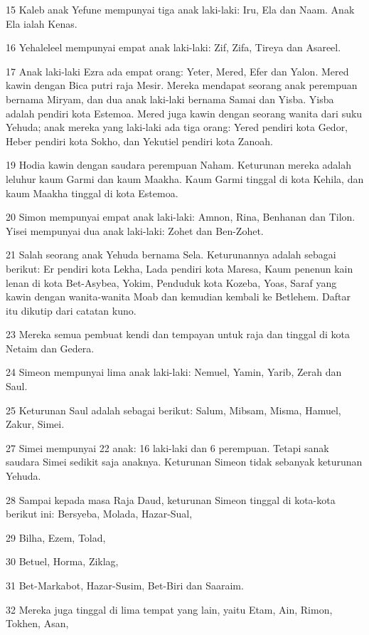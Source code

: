 \par 15 Kaleb anak Yefune mempunyai tiga anak laki-laki: Iru, Ela dan Naam. Anak Ela ialah Kenas.
\par 16 Yehaleleel mempunyai empat anak laki-laki: Zif, Zifa, Tireya dan Asareel.
\par 17 Anak laki-laki Ezra ada empat orang: Yeter, Mered, Efer dan Yalon. Mered kawin dengan Bica putri raja Mesir. Mereka mendapat seorang anak perempuan bernama Miryam, dan dua anak laki-laki bernama Samai dan Yisba. Yisba adalah pendiri kota Estemoa. Mered juga kawin dengan seorang wanita dari suku Yehuda; anak mereka yang laki-laki ada tiga orang: Yered pendiri kota Gedor, Heber pendiri kota Sokho, dan Yekutiel pendiri kota Zanoah.
\par 19 Hodia kawin dengan saudara perempuan Naham. Keturunan mereka adalah leluhur kaum Garmi dan kaum Maakha. Kaum Garmi tinggal di kota Kehila, dan kaum Maakha tinggal di kota Estemoa.
\par 20 Simon mempunyai empat anak laki-laki: Amnon, Rina, Benhanan dan Tilon. Yisei mempunyai dua anak laki-laki: Zohet dan Ben-Zohet.
\par 21 Salah seorang anak Yehuda bernama Sela. Keturunannya adalah sebagai berikut: Er pendiri kota Lekha, Lada pendiri kota Maresa, Kaum penenun kain lenan di kota Bet-Asybea, Yokim, Penduduk kota Kozeba, Yoas, Saraf yang kawin dengan wanita-wanita Moab dan kemudian kembali ke Betlehem. Daftar itu dikutip dari catatan kuno.
\par 23 Mereka semua pembuat kendi dan tempayan untuk raja dan tinggal di kota Netaim dan Gedera.
\par 24 Simeon mempunyai lima anak laki-laki: Nemuel, Yamin, Yarib, Zerah dan Saul.
\par 25 Keturunan Saul adalah sebagai berikut: Salum, Mibsam, Misma, Hamuel, Zakur, Simei.
\par 27 Simei mempunyai 22 anak: 16 laki-laki dan 6 perempuan. Tetapi sanak saudara Simei sedikit saja anaknya. Keturunan Simeon tidak sebanyak keturunan Yehuda.
\par 28 Sampai kepada masa Raja Daud, keturunan Simeon tinggal di kota-kota berikut ini: Bersyeba, Molada, Hazar-Sual,
\par 29 Bilha, Ezem, Tolad,
\par 30 Betuel, Horma, Ziklag,
\par 31 Bet-Markabot, Hazar-Susim, Bet-Biri dan Saaraim.
\par 32 Mereka juga tinggal di lima tempat yang lain, yaitu Etam, Ain, Rimon, Tokhen, Asan,
